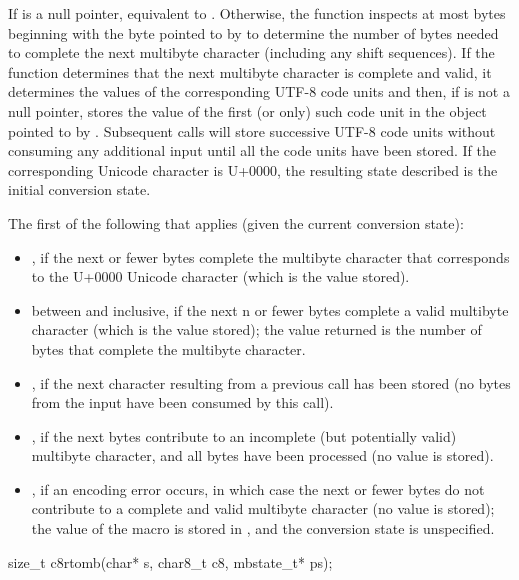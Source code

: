 \begin{itemdescr}
\pnum
\effects
If  is a null pointer,
equivalent to .
Otherwise, the function inspects at most  bytes
beginning with the byte pointed to by 
to determine the number of bytes needed to complete
the next multibyte character (including any shift sequences).
If the function determines
that the next multibyte character is complete and valid,
it determines the values of the corresponding UTF-8 code units and then,
if  is not a null pointer,
stores the value of the first (or only) such code unit
in the object pointed to by .
Subsequent calls will store successive UTF-8 code units
without consuming any additional input
until all the code units have been stored.
If the corresponding Unicode character is U+0000,
the resulting state described is the initial conversion state.

\pnum
\returns
The first of the following that applies (given the current conversion state):
\begin{itemize}
\item {}, if the next  or fewer bytes complete
the multibyte character
that corresponds to the U+0000 Unicode character
(which is the value stored).
\item between  and  inclusive,
if the next n or fewer bytes complete a valid multibyte character
(which is the value stored);
the value returned is the number of bytes that complete the multibyte character.
\item {}, if the next character
resulting from a previous call has been stored
(no bytes from the input have been consumed by this call).
\item {}, if the next  bytes
contribute to an incomplete (but potentially valid) multibyte character, and
all  bytes have been processed (no value is stored).
\item {}, if an encoding error occurs,
in which case the next  or fewer bytes do not contribute to
a complete and valid multibyte character (no value is stored);
the value of the macro  is stored in , and
the conversion state is unspecified.
\end{itemize}
\end{itemdescr}

%
\begin{itemdecl}
size_t c8rtomb(char* s, char8_t c8, mbstate_t* ps);
\end{itemdecl}


